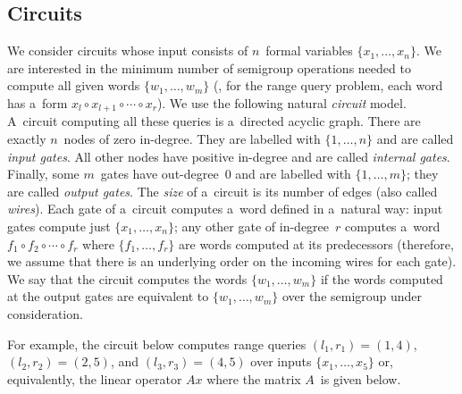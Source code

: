 \subsection{Circuits}\label{subsec:circuits}
We consider circuits whose input consists of $n$~formal variables
$\{x_1, \dotsc, x_n\}$. We are interested in the minimum number of semigroup
operations needed to compute all given words $\{w_1, \dotsc, w_m\}$ (\eg, for
%
%
the range query problem,
each word has a~form $x_l\circ x_{l+1}\circ \dotsb \circ x_r$).
We use
the following natural \emph{circuit} model. A~circuit computing all these queries
is a~directed acyclic graph. There are exactly $n$~nodes of zero in-degree. They
are labelled with $\{1, \dotsc, n\}$ and are called \emph{input gates}. All
other nodes have positive in-degree and are called
%
%
\emph{internal gates}.
%
%
Finally, some
$m$~gates have out-degree~0 and are labelled with $\{1, \dotsc, m\}$; they are
called \emph{output gates}.
The
\emph{size} of a~circuit is its number of edges (also called \emph{wires}). Each
gate of a~circuit computes a~word defined in a~natural way: input gates compute
just $\{x_1, \dotsc, x_n\}$; any other gate of in-degree~$r$ computes a~word
$f_1 \circ f_2 \circ \dotsb \circ f_r$ where $\{f_1, \dotsc, f_r\}$ are words
computed at its predecessors (therefore, we assume that there is an underlying
order on the incoming wires for each gate). We say that the circuit computes the
words $\{w_1, \dotsc, w_m\}$ if the words computed at the output gates are
equivalent to $\{w_1, \dotsc, w_m\}$ over the %
semigroup under consideration.  %

For example, the circuit below computes range queries
$(l_1,r_1)=(1,4)$,
$(l_2,r_2)=(2,5)$, and
$(l_3,r_3)=(4,5)$
over inputs $\{x_1, \dotsc, x_5\}$ or, equivalently, the
linear operator $Ax$ where the matrix $A$~is given below.

\vspace{5mm}
\begin{center}
\end{center}
\vspace{5mm}

